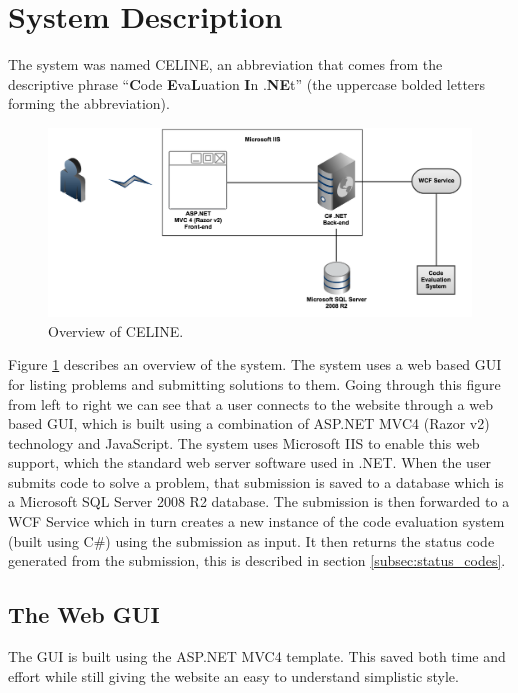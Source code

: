 \section{System Description}
The system was named CELINE, an abbreviation that comes from the descriptive phrase ``\textbf{C}ode \textbf{E}va\textbf{L}uation \textbf{I}n .\textbf{NE}t'' (the uppercase bolded letters forming the abbreviation). 

\begin{figure}[h]
	\centering
	\includegraphics[width=0.9\linewidth]{chapters/media/overview.png}
	\caption{Overview of CELINE.}
	\label{fig:SystemOverview}
\end{figure}

Figure \ref{fig:SystemOverview} describes an overview of the system. The system uses a web based GUI for listing problems and submitting solutions to them. Going through this figure from left to right we can see that a user connects to the website through a web based GUI, which is built using a combination of ASP.NET MVC4 (Razor v2) technology and JavaScript. The system uses Microsoft IIS to enable this web support, which the standard web server software used in .NET. When the user submits code to solve a problem, that submission is saved to a database which is a Microsoft SQL Server 2008 R2 database. The submission is then forwarded to a WCF Service which in turn creates a new instance of the code evaluation system (built using C\#) using the submission as input. It then returns the status code generated from the submission, this is described in section \ref{subsec:status_codes}.


\subsection{The Web GUI}
The GUI is built using the ASP.NET MVC4 template. This saved both time and effort while still giving the website an easy to understand simplistic style. 


